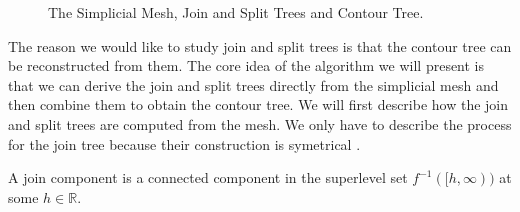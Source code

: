 \begin{figure}[h]
    \caption{The Simplicial Mesh, Join and Split Trees and Contour Tree.}%
    \label{fig:mesh-join-split-contour}%
\end{figure}

The reason we would like to study join and split trees is that the contour tree can be reconstructed from them. The core idea of the algorithm we will present is that we can derive the join and split trees directly from the simplicial mesh and then combine them to obtain the contour tree. We will first describe how the join and split trees are computed from the mesh. We only have to describe the process for the join tree because their construction is symetrical \cite{ct-big-paper}.

\begin{defn} A join component is a connected component in the superlevel set $f^{-1}([h, \infty))$ at some $h \in \mathbb{R}$.  \end{defn}

